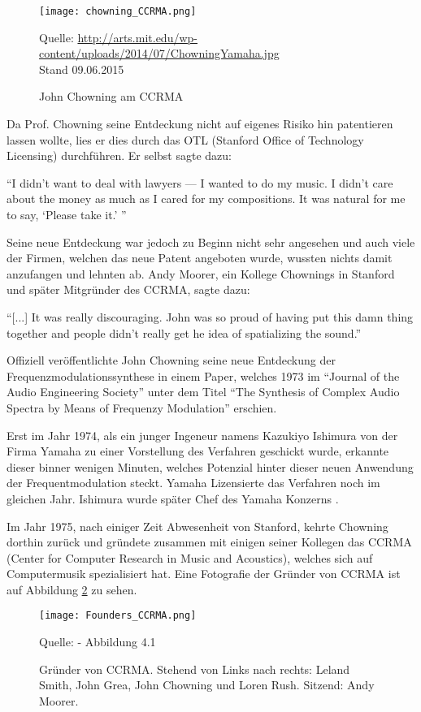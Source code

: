 \begin{figure} [ht]
\centering
  \texttt{[image: chowning\_CCRMA.png]}
\caption{John Chowning am CCRMA}
\label{fig:chowningdx7}
Quelle: \url{ http://arts.mit.edu/wp-content/uploads/2014/07/ChowningYamaha.jpg} \\Stand 09.06.2015
\end{figure}
 
Da Prof. Chowning seine Entdeckung nicht auf eigenes Risiko hin patentieren lassen wollte, lies er dies durch das OTL (Stanford Office of Technology Licensing) durchführen. Er selbst sagte dazu:

``I didn’t want to deal with lawyers — I wanted to do my music. I didn’t care about the money as much as I cared for my compositions. It was natural for me to say, `Please take it.' ''\cite{fatherofdigitalmusik}

 Seine neue Entdeckung war jedoch zu Beginn nicht sehr angesehen und auch viele der Firmen, welchen das neue Patent angeboten wurde, wussten nichts damit anzufangen und lehnten ab. Andy Moorer, ein Kollege Chownings in Stanford und später Mitgründer des CCRMA, sagte dazu: 

``[...] It was really discouraging. John was so proud of having put this damn thing together and people didn't really get he idea of spatializing the sound.''\cite[s. xy]{soundofinnovation}

Offiziell veröffentlichte John Chowning seine neue Entdeckung der Frequenzmodulationssynthese in einem Paper, welches 1973 im ``Journal of the Audio Engineering Society'' unter dem Titel ``The Synthesis of Complex Audio Spectra by Means of Frequenzy Modulation'' erschien.

Erst im Jahr 1974, als ein junger Ingeneur namens Kazukiyo Ishimura von der Firma Yamaha zu einer Vorstellung des Verfahren geschickt wurde, erkannte dieser binner wenigen Minuten, welches Potenzial hinter dieser neuen Anwendung der Frequentmodulation steckt. Yamaha Lizensierte das Verfahren noch im gleichen Jahr. Ishimura wurde später Chef des Yamaha Konzerns \cite{fatherofdigitalmusik}.

Im Jahr 1975, nach einiger Zeit Abwesenheit von Stanford, kehrte Chowning dorthin zurück und gründete zusammen mit einigen seiner Kollegen das CCRMA (Center for Computer Research in Music and Acoustics), welches sich auf Computermusik spezialisiert hat.
Eine Fotografie der Gründer von CCRMA ist auf Abbildung \ref{fig:foundersCCRMA} zu sehen.

\begin{figure} [ht]
\centering
  \texttt{[image: Founders\_CCRMA.png]}
\caption{Gründer von CCRMA. Stehend von Links nach rechts: Leland Smith, John Grea, John Chowning und Loren Rush. Sitzend: Andy Moorer.}
\label{fig:foundersCCRMA}
Quelle: \cite{soundofinnovation} - Abbildung 4.1
\end{figure}

